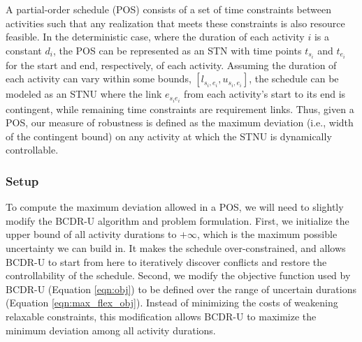 \documentclass[jair,twoside,11pt,theapa]{article}
\newcommand{\taskstarttp}[1]{s_{#1}}
\newcommand{\taskendtp}[1]{e_{#1}}
\newcommand{\link}[2]{e_{{#1}{#2}}}
\begin{document}


A partial-order schedule (POS) consists of a set of time constraints between
activities such that any realization that meets these constraints is also
resource feasible. In the deterministic case, where the duration of each
activity $i$ is a constant $d_i$, the POS can be represented as an STN with time
points $t_{\taskstarttp{i}}$ and $t_{\taskendtp{i}}$ for the start and end,
respectively, of each activity. Assuming the duration of each activity can vary
within some bounds, $[l_{\taskstarttp{i},\taskendtp{i}},
u_{\taskstarttp{i},\taskendtp{i}}]$, the schedule can be modeled as an STNU
where the link $\link{\taskstarttp{i}}{\taskendtp{i}}$ from each activity's
start to its end is contingent, while remaining time constraints are requirement
links. Thus, given a POS, our measure of robustness is defined as the maximum
deviation (i.e., width of the contingent bound) on any activity at which the
STNU is dynamically controllable.


\subsubsection{Setup}

To compute the maximum deviation allowed in a POS, we will need to slightly
modify the BCDR-U algorithm and problem formulation. First, we initialize the
upper bound of all activity durations to $+\infty$, which is the maximum
possible uncertainty we can build in. It makes the schedule over-constrained,
and allows BCDR-U to start from here to iteratively discover conflicts and restore
the controllability of the schedule. Second, we modify the objective function
used by BCDR-U (Equation \ref{eqn:obj}) to be defined over the range of uncertain
durations (Equation \ref{eqn:max_flex_obj}). Instead of minimizing the costs of
weakening relaxable constraints, this modification allows BCDR-U to maximize the
minimum deviation among all activity durations.
\end{document}
